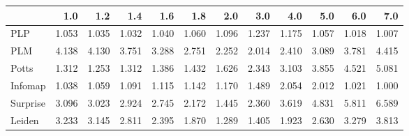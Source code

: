 \begin{tabular}{lrrrrrrrrrrr}
\toprule
{} &   1.0 &   1.2 &   1.4 &   1.6 &   1.8 &   2.0 &   3.0 &   4.0 &   5.0 &   6.0 &   7.0 \\
\midrule
PLP      & 1.053 & 1.035 & 1.032 & 1.040 & 1.060 & 1.096 & 1.237 & 1.175 & 1.057 & 1.018 & 1.007 \\
PLM      & 4.138 & 4.130 & 3.751 & 3.288 & 2.751 & 2.252 & 2.014 & 2.410 & 3.089 & 3.781 & 4.415 \\
Potts    & 1.312 & 1.253 & 1.312 & 1.386 & 1.432 & 1.626 & 2.343 & 3.103 & 3.855 & 4.521 & 5.081 \\
Infomap  & 1.038 & 1.059 & 1.091 & 1.115 & 1.142 & 1.170 & 1.489 & 2.054 & 2.012 & 1.021 & 1.000 \\
Surprise & 3.096 & 3.023 & 2.924 & 2.745 & 2.172 & 1.445 & 2.360 & 3.619 & 4.831 & 5.811 & 6.589 \\
Leiden   & 3.233 & 3.145 & 2.811 & 2.395 & 1.870 & 1.289 & 1.405 & 1.923 & 2.630 & 3.279 & 3.813 \\
\bottomrule
\end{tabular}
